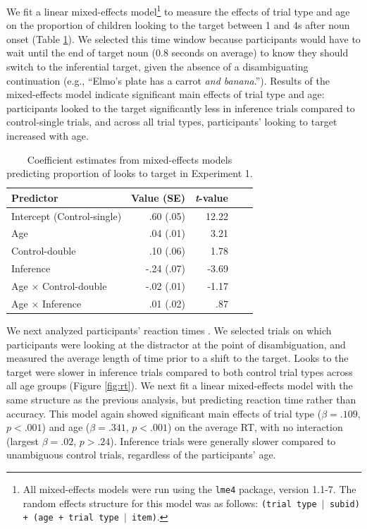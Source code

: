 \documentclass[10pt,letterpaper]{article}
\begin{document}
We fit a linear mixed-effects model\footnote{All mixed-effects models were run using the \texttt{lme4} package, version 1.1-7. The random effects structure for this model was as follows: \texttt{(trial type $|$ subid) + (age + trial type $|$ item)}.} to measure the effects of trial type and age on the proportion of children looking to the target between 1 and 4s after noun onset (Table \ref{tab:lmer1}). We selected this time window because participants would have to wait until the end of target noun (0.8 seconds on average) to know they should switch to the inferential target, given the absence of a disambiguating continuation (e.g., ``Elmo's plate has a carrot \emph{and banana}.''). Results of the mixed-effects model indicate significant main effects of trial type and age: participants looked to the target significantly less in inference trials compared to control-single trials, and across all trial types, participants' looking to target increased with age. 

\begin{table}[t]
\caption{\label{tab:lmer1}  Coefficient estimates from mixed-effects models predicting proportion of looks to target in Experiment 1.} 
\begin{center} 
\begin{tabular}{l r r r l} 
\hline
Predictor  &  Value (SE) & \emph{t}-value\\
\hline
Intercept (Control-single)  & .60 (.05) & 12.22 \\
Age & .04 (.01) &  3.21 \\
Control-double & .10 (.06) & 1.78 \\
Inference & -.24 (.07) & -3.69 \\
Age $\times$ Control-double & -.02 (.01) & -1.17 \\
Age $\times$ Inference & .01 (.02) & .87 \\
\hline
\end{tabular} 
\end{center} 
\end{table}

We next analyzed participants' reaction times \cite{fernald2008looking}. We selected trials on which participants were looking at the distractor at the point of disambiguation, and measured the average length of time prior to a shift to the target. Looks to the target were slower in inference trials compared to both control trial types across all age groups (Figure \ref{fig:rt}). We next fit a linear mixed-effects model with the same structure as the previous analysis, but predicting reaction time rather than accuracy. This model again showed significant main effects of trial type ($\beta = .109$, $p <.001$) and age ($\beta = .341$, $p <.001$) on the average RT, with no interaction (largest $\beta = .02$, $p >.24$). Inference trials were generally slower compared to unambiguous control trials, regardless of the participants' age. 
\end{document}
